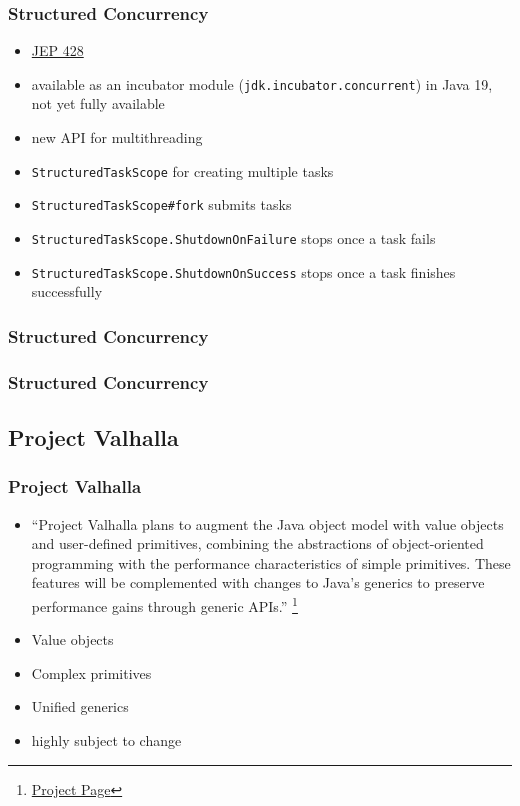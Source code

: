 \documentclass{beamer}
\begin{document}
\begin{frame}
\frametitle{Structured Concurrency}
\begin{itemize}
  \item \href{https://openjdk.org/jeps/428}{JEP 428}
  \item available as an incubator module (\texttt{jdk.incubator.concurrent}) in Java 19, not yet fully available
  \pause
  \item new API for multithreading
  \item \texttt{StructuredTaskScope} for creating multiple tasks
  \item \texttt{StructuredTaskScope\#fork} submits tasks
  \item \texttt{StructuredTaskScope.ShutdownOnFailure} stops once a task fails
  \item \texttt{StructuredTaskScope.ShutdownOnSuccess} stops once a task finishes successfully

\end{itemize}
\end{frame}
\begin{frame}
\frametitle{Structured Concurrency}

\end{frame}
\begin{frame}
\frametitle{Structured Concurrency}

\end{frame}




\subsection{Project Valhalla}
\begin{frame}
\frametitle{Project Valhalla}
\begin{itemize}
  \item ``Project Valhalla plans to augment the Java object model with value objects and user-defined primitives, combining the abstractions of object-oriented programming with the performance characteristics of simple primitives. These features will be complemented with changes to Java's generics to preserve performance gains through generic APIs.''
  \footnote{\href{https://openjdk.org/projects/valhalla/}{Project Page}}
  \pause
  \item Value objects
  \item Complex primitives
  \item Unified generics
  \item highly subject to change
\end{itemize}
\end{frame}
\end{document}
